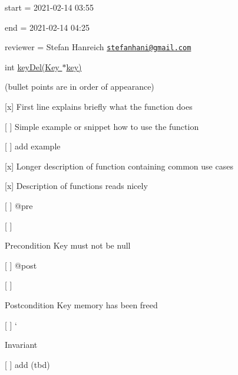 
\begin{DoxyItemize}
\item start = 2021-\/02-\/14 03\+:55
\item end = 2021-\/02-\/14 04\+:25
\item reviewer = Stefan Hanreich \href{mailto:stefanhani@gmail.com}{\tt stefanhani@gmail.\+com}
\end{DoxyItemize}

{\ttfamily int \hyperlink{group__key_ga3df95bbc2494e3e6703ece5639be5bb1}{key\+Del(\+Key $\ast$key)}}

(bullet points are in order of appearance)


\begin{DoxyItemize}
\item \mbox{[}x\mbox{]} First line explains briefly what the function does
\item \mbox{[} \mbox{]} Simple example or snippet how to use the function
\begin{DoxyItemize}
\item \mbox{[} \mbox{]} add example
\end{DoxyItemize}
\item \mbox{[}x\mbox{]} Longer description of function containing common use cases
\item \mbox{[}x\mbox{]} Description of functions reads nicely
\item \mbox{[} \mbox{]} {\ttfamily @pre}
\begin{DoxyItemize}
\item \mbox{[} \mbox{]} \begin{DoxyPrecond}{Precondition}
Key must not be null
\end{DoxyPrecond}

\end{DoxyItemize}
\item \mbox{[} \mbox{]} {\ttfamily @post}
\begin{DoxyItemize}
\item \mbox{[} \mbox{]} \begin{DoxyPostcond}{Postcondition}
Key memory has been freed
\end{DoxyPostcond}

\end{DoxyItemize}
\item \mbox{[} \mbox{]} `\begin{DoxyInvariant}{Invariant}

\begin{DoxyItemize}
\item \mbox{[} \mbox{]} add (tbd)
\end{DoxyItemize}
\end{DoxyInvariant}


\end{DoxyItemize}
